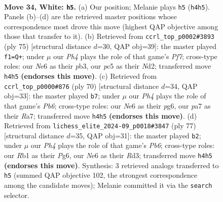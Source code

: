 \documentclass[11pt]{article}
\begin{document}
\clearpage

\begin{figure}[p]\centering
\begin{subfigure}{0.46\textwidth}\centering
\resizebox{\linewidth}{!}{%
\newchessgame
\chessboard[
  setfen={8/pp5R/k3N3/2p2p2/4p2P/8/PPr4r/1R1K4 w - - 1 34},
  showmover=false,
  pgfstyle=straightmove, color=movearrow, markmove={h4-h5}
]}
\caption{}
\end{subfigure}\hfill
\begin{subfigure}{0.46\textwidth}\centering
\resizebox{\linewidth}{!}{%
\newchessgame
\chessboard[
  setfen={3r1k2/6RR/1r4p1/1p6/8/PP6/2Pn1pBP/2K5 b - - 3 38},
  showmover=false,
  pgfstyle=straightmove, color=movearrow, markmove={f2-f1}
]}
\caption{}
\end{subfigure}
\\[4pt]
\begin{subfigure}{0.46\textwidth}\centering
\resizebox{\linewidth}{!}{%
\newchessgame
\chessboard[
  setfen={6k1/R4p1p/1P4p1/8/3P4/6P1/1r3r1P/3R2K1 w - - 0 36},
  showmover=false,
  pgfstyle=straightmove, color=movearrow, markmove={b6-b7}
]}
\caption{}
\end{subfigure}\hfill
\begin{subfigure}{0.46\textwidth}\centering
\resizebox{\linewidth}{!}{%
\newchessgame
\chessboard[
  setfen={6k1/1R3R1p/6p1/p7/P7/1p1r2PP/3n1P2/6K1 b - - 0 39},
  showmover=false,
  pgfstyle=straightmove, color=movearrow, markmove={b3-b2}
]}
\caption{}
\end{subfigure}
\caption{\textbf{Move 34, White: \texttt{h5}.} (a) Our position; Melanie plays \texttt{h5} (\texttt{h4h5}). Panels (b)--(d) are the retrieved master positions whose correspondence most drove this move (highest QAP objective among those that transfer to it). (b) Retrieved from \texttt{ccrl\_top\_p0002\#3893} (ply 75) [structural distance $d$=30, QAP obj=39]: the master played \texttt{f1=Q+}; under $\mu$ our \emph{Ph4} plays the role of that game's \emph{Pf7}; cross-type roles: our \emph{N}e6 as their \emph{p}b3, our \emph{p}c5 as their \emph{N}d2; transferred move \texttt{h4h5} \textbf{(endorses this move)}. (c) Retrieved from \texttt{ccrl\_top\_p0000\#876} (ply 70) [structural distance $d$=34, QAP obj=33]: the master played \texttt{b7}; under $\mu$ our \emph{Ph4} plays the role of that game's \emph{Pb6}; cross-type roles: our \emph{N}e6 as their \emph{p}g6, our \emph{p}a7 as their \emph{R}a7; transferred move \texttt{h4h5} \textbf{(endorses this move)}. (d) Retrieved from \texttt{lichess\_elite\_2024-09\_p0018\#3847} (ply 77) [structural distance $d$=35, QAP obj=31]: the master played \texttt{b2}; under $\mu$ our \emph{Ph4} plays the role of that game's \emph{Pb6}; cross-type roles: our \emph{R}b1 as their \emph{P}g6, our \emph{N}e6 as their \emph{R}d3; transferred move \texttt{h4h5} \textbf{(endorses this move)}. Synthesis: 3 retrieved analogs transferred to \texttt{h5} (summed QAP objective 102, the strongest correspondence among the candidate moves); Melanie committed it via the \texttt{search} selector.}
\label{fig:thought-m66}
\end{figure}
\end{document}
